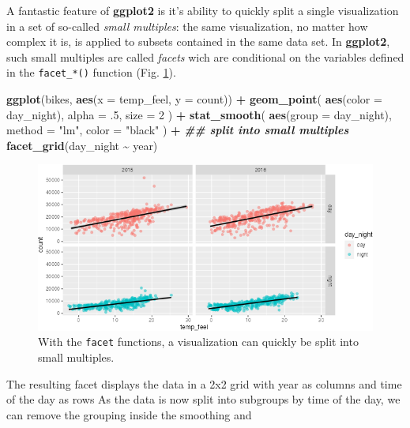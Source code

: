 \documentclass[
]{krantz}
\makeatletter
\newenvironment{Shaded}{\begin{snugshade}}{\end{snugshade}}
\newcommand{\AttributeTok}[1]{\textcolor[rgb]{0.27,0.27,0.27}{#1}}
\newcommand{\DecValTok}[1]{\textcolor[rgb]{0.06,0.06,0.06}{#1}}
\newcommand{\DocumentationTok}[1]{\textcolor[rgb]{0.37,0.37,0.37}{\textbf{\textit{#1}}}}
\newcommand{\FunctionTok}[1]{\textcolor[rgb]{0.27,0.27,0.27}{\textbf{#1}}}
\newcommand{\NormalTok}[1]{#1}
\newcommand{\SpecialCharTok}[1]{\textcolor[rgb]{0.43,0.43,0.43}{\textbf{#1}}}
\newcommand{\StringTok}[1]{\textcolor[rgb]{0.5,0.5,0.5}{#1}}
\newenvironment{kframe}{%
\medskip{}
\setlength{\fboxsep}{.8em}
 \def\at@end@of@kframe{}%
 \ifinner\ifhmode%
  \def\at@end@of@kframe{\end{minipage}}%
  \begin{minipage}{\columnwidth}%
 \fi\fi%
 \def\FrameCommand##1{\hskip\@totalleftmargin \hskip-\fboxsep
 \colorbox{shadecolor}{##1}\hskip-\fboxsep
     \hskip-\linewidth \hskip-\@totalleftmargin \hskip\columnwidth}%
 \MakeFramed {\advance\hsize-\width
   \@totalleftmargin\z@ \linewidth\hsize
   \@setminipage}}%
 {\par\unskip\endMakeFramed%
 \at@end@of@kframe}
\renewenvironment{Shaded}{\begin{kframe}}{\end{kframe}}
\makeatother
\begin{document}
A fantastic feature of \textbf{ggplot2} is it's ability to quickly split a single visualization in a set of so-called \emph{small multiples}: the same visualization, no matter how complex it is, is applied to subsets contained in the same data set. In \textbf{ggplot2}, such small multiples are called \emph{facets} wich are conditional on the variables defined in the \texttt{facet\_*()} function (Fig. \ref{fig:04ggplotFacet}).

\begin{Shaded}
\begin{Highlighting}[]
\FunctionTok{ggplot}\NormalTok{(bikes, }\FunctionTok{aes}\NormalTok{(}\AttributeTok{x =}\NormalTok{ temp\_feel, }\AttributeTok{y =}\NormalTok{ count)) }\SpecialCharTok{+} 
  \FunctionTok{geom\_point}\NormalTok{(}
    \FunctionTok{aes}\NormalTok{(}\AttributeTok{color =}\NormalTok{ day\_night), }\AttributeTok{alpha =}\NormalTok{ .}\DecValTok{5}\NormalTok{, }\AttributeTok{size =} \DecValTok{2}
\NormalTok{  ) }\SpecialCharTok{+} 
  \FunctionTok{stat\_smooth}\NormalTok{(}
    \FunctionTok{aes}\NormalTok{(}\AttributeTok{group =}\NormalTok{ day\_night), }\AttributeTok{method =} \StringTok{"lm"}\NormalTok{, }\AttributeTok{color =} \StringTok{"black"}
\NormalTok{  ) }\SpecialCharTok{+}
  \DocumentationTok{\#\# split into small multiples}
  \FunctionTok{facet\_grid}\NormalTok{(day\_night }\SpecialCharTok{\textasciitilde{}}\NormalTok{ year)}
\end{Highlighting}
\end{Shaded}

\begin{figure}
\centering
\includegraphics{bookdown_files/figure-latex/04ggplotFacet-1.png}
\caption{\label{fig:04ggplotFacet}With the \texttt{facet} functions, a visualization can quickly be split into small multiples.}
\end{figure}

The resulting facet displays the data in a 2x2 grid with year as columns and time of the day as rows
As the data is now split into subgroups by time of the day, we can remove the grouping inside the smoothing and
\end{document}
